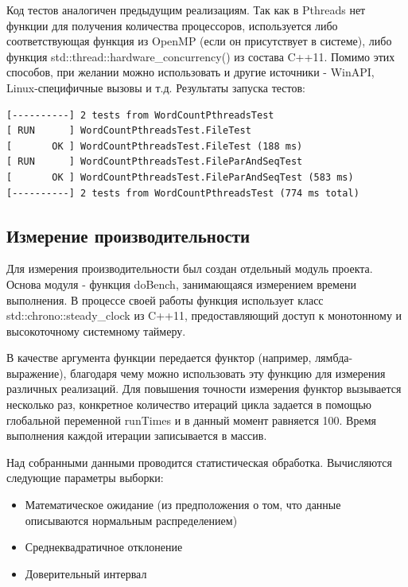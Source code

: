 

Код тестов аналогичен предыдущим реализациям. Так как в Pthreads нет функции для получения количества процессоров, используется либо соответствующая функция из OpenMP (если он присутствует в системе), либо функция std::thread::hardware\_concurrency() из состава C++11. Помимо этих способов, при желании можно использовать и другие источники - WinAPI, Linux-специфичные вызовы и т.д. Результаты запуска тестов:
\begin{lstlisting}
[----------] 2 tests from WordCountPthreadsTest
[ RUN      ] WordCountPthreadsTest.FileTest
[       OK ] WordCountPthreadsTest.FileTest (188 ms)
[ RUN      ] WordCountPthreadsTest.FileParAndSeqTest
[       OK ] WordCountPthreadsTest.FileParAndSeqTest (583 ms)
[----------] 2 tests from WordCountPthreadsTest (774 ms total)
\end{lstlisting}

\subsection{Измерение производительности}

Для измерения производительности был создан отдельный модуль проекта. Основа модуля - функция doBench, занимающаяся измерением времени выполнения. В процессе своей работы функция использует класс std::chrono::steady\_clock из C++11, предоставляющий доступ к монотонному и высокоточному системному таймеру.

В качестве аргумента функции передается функтор (например, лямбда-выражение), благодаря чему можно использовать эту функцию для измерения различных реализаций. Для повышения точности измерения функтор вызывается несколько раз, конкретное количество итераций цикла задается в помощью глобальной переменной runTimes и в данный момент равняется 100. Время выполнения каждой итерации записывается в массив.



Над собранными данными проводится статистическая обработка. Вычисляются следующие параметры выборки:
\begin{itemize}
	\item Математическое ожидание (из предположения о том, что данные описываются нормальным распределением)
	\item Среднеквадратичное отклонение
	\item Доверительный интервал
\end{itemize}

